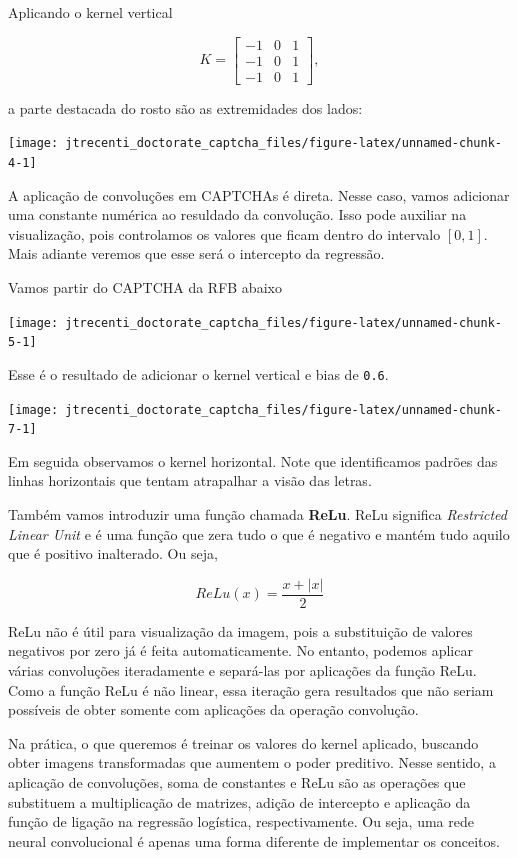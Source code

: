 \documentclass[12pt,]{report}
\begin{document}
Aplicando o kernel vertical

\[
K = \left[\begin{array}{rrr}-1&0&1\\-1&0&1\\-1&0&1\end{array}\right],
\]

a parte destacada do rosto são as extremidades dos lados:

\begin{center}\texttt{[image: jtrecenti\_doctorate\_captcha\_files/figure-latex/unnamed-chunk-4-1]} \end{center}

A aplicação de convoluções em CAPTCHAs é direta. Nesse caso, vamos
adicionar uma constante numérica ao resuldado da convolução. Isso pode
auxiliar na visualização, pois controlamos os valores que ficam dentro
do intervalo \([0,1]\). Mais adiante veremos que esse será o intercepto
da regressão.

Vamos partir do CAPTCHA da RFB abaixo

\begin{center}\texttt{[image: jtrecenti\_doctorate\_captcha\_files/figure-latex/unnamed-chunk-5-1]} \end{center}

Esse é o resultado de adicionar o kernel vertical e bias de
\texttt{0.6}.

\begin{center}\texttt{[image: jtrecenti\_doctorate\_captcha\_files/figure-latex/unnamed-chunk-7-1]} \end{center}

Em seguida observamos o kernel horizontal. Note que identificamos
padrões das linhas horizontais que tentam atrapalhar a visão das letras.

Também vamos introduzir uma função chamada \textbf{ReLu}. ReLu significa
\emph{Restricted Linear Unit} e é uma função que zera tudo o que é
negativo e mantém tudo aquilo que é positivo inalterado. Ou seja,

\[
ReLu(x) = \frac{x + |x|}{2}
\]

ReLu não é útil para visualização da imagem, pois a substituição de
valores negativos por zero já é feita automaticamente. No entanto,
podemos aplicar várias convoluções iteradamente e separá-las por
aplicações da função ReLu. Como a função ReLu é não linear, essa
iteração gera resultados que não seriam possíveis de obter somente com
aplicações da operação convolução.

Na prática, o que queremos é treinar os valores do kernel aplicado,
buscando obter imagens transformadas que aumentem o poder preditivo.
Nesse sentido, a aplicação de convoluções, soma de constantes e ReLu são
as operações que substituem a multiplicação de matrizes, adição de
intercepto e aplicação da função de ligação na regressão logística,
respectivamente. Ou seja, uma rede neural convolucional é apenas uma
forma diferente de implementar os conceitos.
\end{document}
